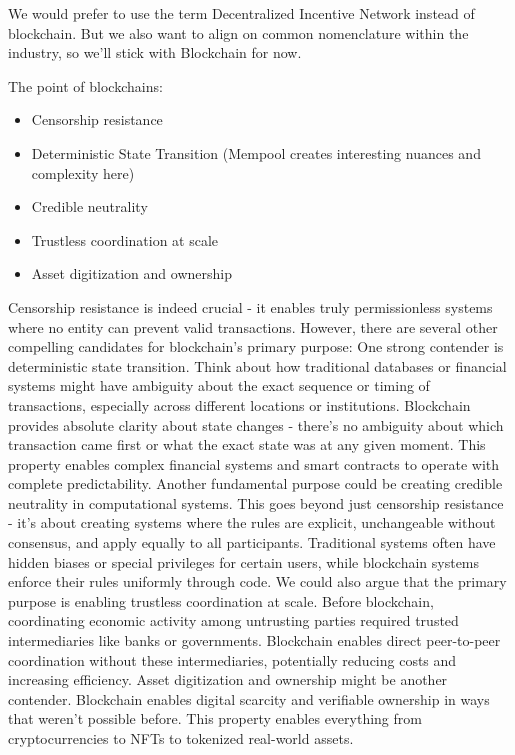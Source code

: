 \documentclass[
  letterpaper,
  DIV=11,
  numbers=noendperiod]{scrreprt}
\providecommand{\tightlist}{%
  \setlength{\itemsep}{0pt}\setlength{\parskip}{0pt}}\usepackage{longtable,booktabs,array}
\begin{document}
We would prefer to use the term Decentralized Incentive Network instead
of blockchain. But we also want to align on common nomenclature within
the industry, so we'll stick with Blockchain for now.

The point of blockchains:

\begin{itemize}
\tightlist
\item
  Censorship resistance
\item
  Deterministic State Transition (Mempool creates interesting nuances
  and complexity here)
\item
  Credible neutrality
\item
  Trustless coordination at scale
\item
  Asset digitization and ownership
\end{itemize}

Censorship resistance is indeed crucial - it enables truly
permissionless systems where no entity can prevent valid transactions.
However, there are several other compelling candidates for blockchain's
primary purpose: One strong contender is deterministic state transition.
Think about how traditional databases or financial systems might have
ambiguity about the exact sequence or timing of transactions, especially
across different locations or institutions. Blockchain provides absolute
clarity about state changes - there's no ambiguity about which
transaction came first or what the exact state was at any given moment.
This property enables complex financial systems and smart contracts to
operate with complete predictability. Another fundamental purpose could
be creating credible neutrality in computational systems. This goes
beyond just censorship resistance - it's about creating systems where
the rules are explicit, unchangeable without consensus, and apply
equally to all participants. Traditional systems often have hidden
biases or special privileges for certain users, while blockchain systems
enforce their rules uniformly through code. We could also argue that the
primary purpose is enabling trustless coordination at scale. Before
blockchain, coordinating economic activity among untrusting parties
required trusted intermediaries like banks or governments. Blockchain
enables direct peer-to-peer coordination without these intermediaries,
potentially reducing costs and increasing efficiency. Asset digitization
and ownership might be another contender. Blockchain enables digital
scarcity and verifiable ownership in ways that weren't possible before.
This property enables everything from cryptocurrencies to NFTs to
tokenized real-world assets.
\end{document}

